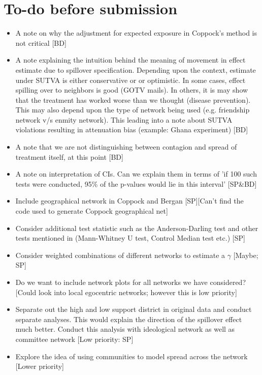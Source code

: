 \documentclass[12pt]{article}
\begin{document}
\thispagestyle{empty}
\doublespacing


\section{To-do before submission}
\begin{itemize}

\item A note on why the adjustment for expected exposure in Coppock's method is not critical [BD]

\item A note explaining the intuition behind the meaning of movement in effect estimate due to spillover specification. Depending upon the context, estimate under SUTVA is either conservative or or optimistic. In some cases, effect spilling over to neighbors is good (GOTV mails). In others, it is may show that the treatment has worked worse than we thought (disease prevention). This may also depend upon the type of network being used (e.g. friendship network v/s enmity network). This leading into a note about SUTVA violations resulting in attenuation bias (example: Ghana experiment) [BD]

\item A note that we are not distinguishing between contagion and spread of treatment itself, at this point [BD]

\item A note on interpretation of CIs. Can we explain them in terms of 'if 100 such tests were conducted, 95\% of the p-values would lie in this interval' [SP\&BD]

\item Include geographical network in Coppock and Bergan [SP][Can't find the code used to generate Coppock geographical net]

\item Consider additional test statistic such as the Anderson-Darling test and other tests mentioned in \citep{rosenbaum2012interference} (Mann-Whitney U test, Control Median test etc.) [SP]

\item Consider weighted combinations of different networks to estimate a $\gamma$ [Maybe; SP]

\item Do we want to include network plots for all networks we have considered? [Could look into local egocentric networks; however this is low priority]

\item Separate out the high and low support district in original data and conduct separate analyses. This would explain the direction of the spillover effect much better. Conduct this analysis with ideological network as well as committee network [Low priority: SP]

\item Explore the idea of using communities to model spread across the network [Lower priority]

\end{itemize}
\end{document}
